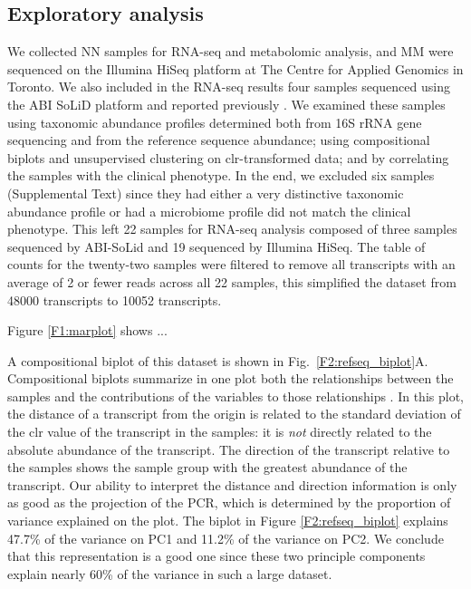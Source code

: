 \documentclass[10pt,letterpaper]{article}
\begin{document}
\subsection{Exploratory analysis}
We collected NN samples for RNA-seq and metabolomic analysis, and MM were sequenced on the Illumina HiSeq platform at The Centre for Applied Genomics in Toronto. We also included in the RNA-seq results four samples sequenced using the ABI SoLiD platform and reported previously \cite{macklaim:2013}. We examined these samples using taxonomic abundance profiles determined both from 16S rRNA gene sequencing and from the reference sequence abundance; using  compositional biplots and unsupervised clustering on clr-transformed data; and by correlating the samples with the clinical phenotype. In the end, we excluded six samples  (Supplemental Text) since they had either a very distinctive taxonomic abundance profile or had a microbiome profile did not match the clinical phenotype. This left 22 samples for RNA-seq analysis composed of three samples sequenced by ABI-SoLid and 19 sequenced by Illumina HiSeq. The table of counts for the twenty-two samples were filtered to remove all transcripts with an average of 2 or fewer reads across all 22 samples, this simplified the dataset from 48000 transcripts to 10052 transcripts. 

Figure \ref{F1:marplot} shows ...

A compositional biplot of this dataset is shown in Fig.~\ref{F2:refseq_biplot}A. Compositional biplots summarize in one plot both the relationships between the samples and the contributions of the variables to those relationships \cite{aitchison2002biplots}. In this plot, the distance of a transcript from the origin is  related to the standard deviation of the clr value of the transcript in the samples: it is \emph{not} directly related to the absolute abundance of the transcript. The direction of the transcript relative to the samples shows the sample group with the greatest abundance of the transcript. Our ability to interpret the distance and direction information is only as good as the projection of the PCR, which is determined by the proportion of variance explained on the plot. The biplot in Figure \ref{F2:refseq_biplot} explains 47.7\% of the variance on PC1 and 11.2\% of the variance on PC2. We conclude that this representation is a good one since these two principle components explain nearly 60\% of the variance in such a large dataset.
\end{document}
